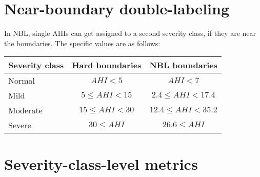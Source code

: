 \section{Near-boundary double-labeling \label{Apx-NBL}}

In NBL, single AHIs can get assigned to a second severity class, if they are near the boundaries. The specific values are as follows:

\renewcommand{\arraystretch}{1.5}
\begin{table}[h!]
    \centering
    \begin{tabular}{ l c c }
        Severity class & Hard boundaries & NBL boundaries \\
        \hline
        Normal   & $ AHI < 5 $         & $ AHI < 7 $             \\
        Mild     & $ 5 \le AHI < 15 $  & $ 2.4 \le AHI < 17.4 $  \\
        Moderate & $ 15 \le AHI < 30 $ & $ 12.4 \le AHI < 35.2 $ \\
        Severe   & $ 30 \le AHI $      & $ 26.6 \le AHI $        \\
    \end{tabular}
\end{table}

\newpage %
\section{Severity-class-level metrics \label{Apx-Severity-Metrics}}

